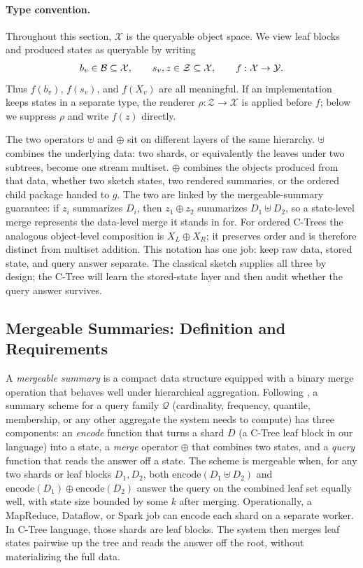 \paragraph{Type convention.}
Throughout this section, \(\mathcal X\) is the queryable object space.
We view leaf blocks and produced states as queryable by writing
\[
  b_v\in\mathcal B\subseteq\mathcal X,\qquad
  s_v,z\in\mathcal Z\subseteq\mathcal X,\qquad
  f:\mathcal X\to\mathcal{Y} .
\]
Thus \(f(b_v)\), \(f(s_v)\), and \(f(X_v)\) are all meaningful. If an
implementation keeps states in a separate type, the renderer
\(\rho:\mathcal Z\to\mathcal X\) is applied before \(f\); below we
suppress \(\rho\) and write \(f(z)\) directly.

The two operators \(\uplus\) and \(\oplus\) sit on different layers of
the same hierarchy. \(\uplus\) combines the underlying data: two
shards, or equivalently the leaves under two subtrees, become one
stream multiset. \(\oplus\) combines the objects produced from that
data, whether two sketch states, two rendered summaries, or the
ordered child package handed to \(g\). The two are linked by the
mergeable-summary guarantee: if \(z_i\) summarizes \(D_i\), then
\(z_1\oplus z_2\) summarizes \(D_1\uplus D_2\), so a state-level merge
represents the data-level merge it stands in for. For ordered C-Trees
the analogous object-level composition is \(X_L\oplus X_R\); it
preserves order and is therefore distinct from multiset addition.
This notation has one job: keep raw data, stored state, and query
answer separate. The classical sketch supplies all three by design;
the C-Tree will learn the stored-state layer and then audit whether the
query answer survives.

\subsection{Mergeable Summaries: Definition and Requirements}
\label{sec:v7-mergeable-pattern}

A \emph{mergeable summary} is a compact data structure equipped with a
binary merge operation that behaves well under hierarchical aggregation.
Following \citet{Agarwal2013MergeableTODS}, a summary scheme for a query
family \(\mathcal{Q}\) (cardinality, frequency, quantile, membership,
or any other aggregate the system needs to compute) has three
components: an \emph{encode} function that turns a shard \(D\) (a
C-Tree leaf block in our language) into a state, a \emph{merge}
operator \(\oplus\) that combines two states, and a \emph{query}
function that reads the answer off a state. The scheme is mergeable
when, for any two shards or leaf blocks \(D_1,D_2\), both
\(\mathrm{encode}(D_1\uplus D_2)\) and
\(\mathrm{encode}(D_1)\oplus\mathrm{encode}(D_2)\) answer the query on
the combined leaf set equally well, with state size bounded by some
\(k\) after merging. Operationally, a MapReduce, Dataflow, or Spark job
can encode each shard on a separate worker. In C-Tree language, those
shards are leaf blocks. The system then merges leaf states pairwise up
the tree and reads the answer off the root, without materializing the
full data.

